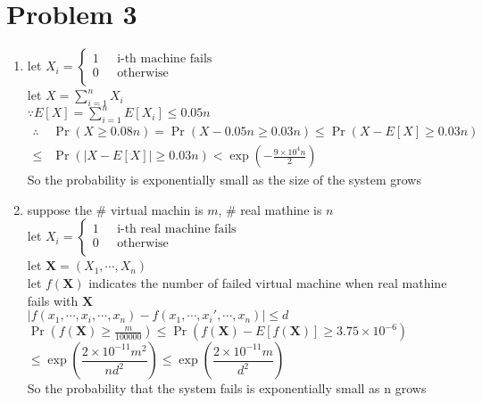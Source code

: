 \documentclass[12pt]{article}
\begin{document}
\section*{Problem 3}
\begin{enumerate}
\item
let 
$
X_i=\left\{
	\begin{aligned}
	1~~~&\text{i-th machine fails}\\
	0~~~&\text{otherwise}\\
	\end{aligned}
\right.
$\\

let $X=\sum_{i=1}^n X_i$\\
$\because E[X]=\sum_{i=1}^nE[X_i]\leq0.05n$\\
$\begin{aligned}
\therefore&\Pr(X\geq 0.08n)=\Pr(X-0.05n\geq 0.03n)\leq\Pr(X-E[X]\geq 0.03n)\\
\leq&\Pr(|X-E[X]|\geq 0.03n)<\exp(-\frac{9\times10^4n}{2})
\end{aligned}
$\\
So the probability is exponentially small as the size of the system grows\\

\item
suppose the \# virtual machin is $m$, \# real mathine is $n$\\
let 
$
X_i=\left\{
	\begin{aligned}
	1~~~&\text{i-th real machine fails}\\
	0~~~&\text{otherwise}\\
	\end{aligned}
\right.
$\\
let $\mathbf{X}=(X_1,\cdots,X_n)$\\
let $f(\mathbf{X})$ indicates the number of failed virtual machine when real mathine fails with $\mathbf{X}$\\
$|f(x_1,\cdots,x_i,\cdots,x_n)-f(x_1,\cdots,x_i',\cdots,x_n)|\leq d$\\

$\Pr\left(f(\mathbf{X})\geq\frac{m}{100000}\right)\leq\Pr(f(\mathbf{X})-E[f(\mathbf{X})]\geq 3.75\times10^{-6})$\\ 
$\leq \exp\left(\dfrac{2\times10^{-11}m^2}{nd^2}\right)\leq\exp\left(\dfrac{2\times10^{-11}m}{d^2}\right)$\\
So the probability that the system fails is exponentially small as n grows\\
\end{enumerate}
\end{document}
